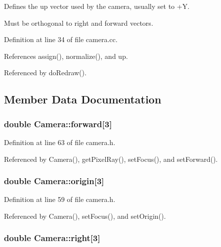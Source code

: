 Defines the up vector used by the camera, usually set to +\+Y. 

Must be orthogonal to right and forward vectors. 

Definition at line 34 of file camera.\+cc.



References assign(), normalize(), and up.



Referenced by do\+Redraw().



\subsection{Member Data Documentation}
\subsubsection[{forward}]{\setlength{\rightskip}{0pt plus 5cm}double Camera\+::forward[3]\hspace{0.3cm}{\ttfamily [private]}}\label{class_camera_aa73fe4b7a65620ba8666a6e4153ef5e0}


Definition at line 63 of file camera.\+h.



Referenced by Camera(), get\+Pixel\+Ray(), set\+Focus(), and set\+Forward().

\subsubsection[{origin}]{\setlength{\rightskip}{0pt plus 5cm}double Camera\+::origin[3]\hspace{0.3cm}{\ttfamily [private]}}\label{class_camera_ab434eeb127d9900a8c62c3de293776e2}


Definition at line 59 of file camera.\+h.



Referenced by Camera(), set\+Focus(), and set\+Origin().

\subsubsection[{right}]{\setlength{\rightskip}{0pt plus 5cm}double Camera\+::right[3]\hspace{0.3cm}{\ttfamily [private]}}\label{class_camera_a1b0770aece5b6ab495c1b38557fa6de8}


